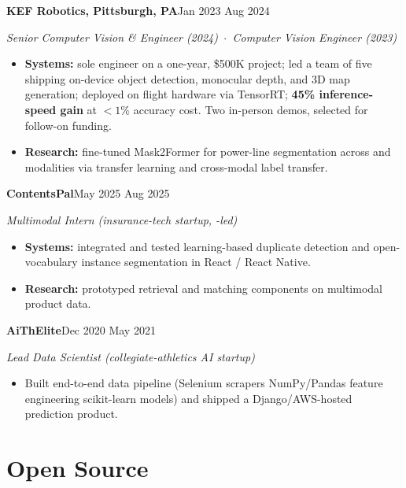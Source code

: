 \documentclass[10pt,letterpaper]{article}
\newif\ifshortversion
\newcommand{\sansfam}{\sffamily}
\newcommand{\datestamp}[1]{{\sansfam\footnotesize\color{meta}\figureversion{lf}#1}}
\newcommand{\role}[2]{%
  \filbreak%
  \par\vspace{1pt}%
  \noindent\textbf{#1}\hfill\datestamp{#2}\par\nopagebreak}
\newcommand{\sub}[1]{\noindent\textit{\footnotesize\color{meta} #1}\par\nopagebreak}
\newcommand{\acro}[1]{\textls[80]{#1}}
\begin{document}
\role{KEF Robotics, Pittsburgh, PA}{Jan 2023 \textendash{} Aug 2024}
\sub{Senior Computer Vision \& \acro{ML} Engineer (2024) \,$\cdot$\, Computer Vision Engineer (2023)}
\begin{itemize}
  \item \textbf{Systems:} sole \acro{ML} engineer on a one-year, \$500K project; led a team of five shipping on-device object detection, monocular depth, and 3D map generation; deployed on flight hardware via TensorRT; \textbf{45\% inference-speed gain} at $<\!1\%$ accuracy cost. Two in-person demos, selected for follow-on funding.
  \item \textbf{Research:} fine-tuned Mask2Former for power-line segmentation across \acro{RGB} and \acro{IR} modalities via transfer learning and cross-modal label transfer.
\end{itemize}

\role{ContentsPal}{May 2025 \textendash{} Aug 2025}
\sub{Multimodal \acro{AI} Intern (insurance-tech startup, \acro{MIT}-led)}
\begin{itemize}
  \item \textbf{Systems:} integrated and tested learning-based duplicate detection and open-vocabulary instance segmentation in React / React Native.
  \item \textbf{Research:} prototyped retrieval and matching components on multimodal product data.
\end{itemize}

\ifshortversion\else
\role{AiThElite}{Dec 2020 \textendash{} May 2021}
\sub{Lead Data Scientist (collegiate-athletics AI startup)}
\begin{itemize}
  \item Built end-to-end data pipeline (Selenium scrapers \textrightarrow{} NumPy/Pandas feature engineering \textrightarrow{} scikit-learn models) and shipped a Django/AWS-hosted prediction product.
\end{itemize}
\fi

\section{Open Source}
\end{document}
